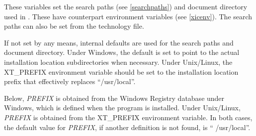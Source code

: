 These variables set the search paths (see \ref{searchpaths}) and
document directory used in {\Xic}.  These have counterpart environment
variables (see \ref{xicenv}).  The search paths can also be set from
the technology file.

If not set by any means, internal defaults are used for the search
paths and document directory.  Under Windows, the default is set to
point to the actual installation location subdirectories when
necessary.  Under Unix/Linux, the {\et XT\_PREFIX} environment variable
should be set to the installation location prefix that effectively
replaces ``{\vt /usr/local}''.

Below, {\it PREFIX} is obtained from the Windows Registry database
under Windows, which is defined when the program is installed.  Under
Unix/Linux, {\it PREFIX} is obtained from the {\et XT\_PREFIX}
environment variable.  In both cases, the default value for {\it
PREFIX\/}, if another definition is not found, is ``{\vt
/usr/local}''.

